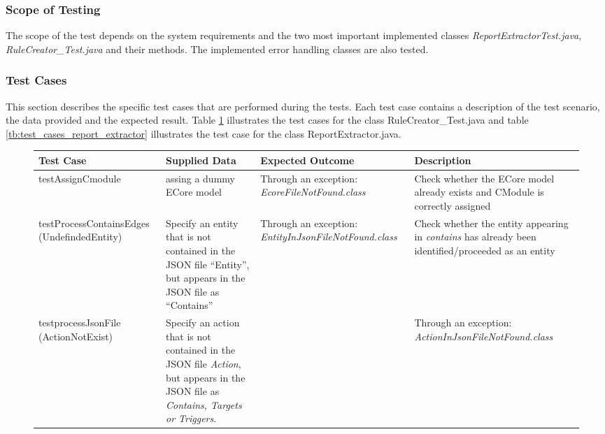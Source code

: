 \subsubsection*{Scope of Testing}
The scope of the test depends on the system requirements and the two most important implemented classes \textit{ReportExtractorTest.java}, \textit{RuleCreator\_Test.java} and their methods. The implemented error handling classes are also tested.

\subsubsection*{Test Cases}
This section describes the specific test cases that are performed during the tests. Each test case contains a description of the test scenario, the data provided and the expected result. Table \ref{tb:test_cases_rule_creator} illustrates the test cases for the class RuleCreator\_Test.java and table \ref{tb:test_cases_report_extractor} illustrates the test case for the class ReportExtractor.java.
\begin{figure}[h]
	\begingroup
	\centering
	\scriptsize
	\renewcommand{\arraystretch}{1.5} 
	\begin{tabularx}{\textwidth}{X  X  X  X}
		\hline
		Test Case	&Supplied Data &	Expected Outcome &Description \\
		\hline\hline
	
		
		testAssignCmodule&	assing a dummy ECore model	&Through an exception: \textit{EcoreFileNotFound.class}&Check whether the ECore model already exists and CModule is correctly assigned \\
		
		testProcessContainsEdges (UndefindedEntity)& Specify an entity that is not contained in the JSON file \enquote{Entity}, but appears in the JSON file as \enquote{Contains}	& Through an exception: \textit{EntityInJsonFileNotFound.class}& Check whether the entity appearing in \textit{contains} has already been identified/proceeded as an entity \\
		
		testprocessJsonFile (ActionNotExist)&Specify an action that is not contained in the JSON file \textit{Action}, but appears in the JSON file as \textit{Contains, Targets or Triggers}. &&Through an exception: \textit{ActionInJsonFileNotFound.class} \\
		
		\hline
	\end{tabularx}
	
	\label{tb:test_cases_rule_creator}
	
	\endgroup
\end{figure}


